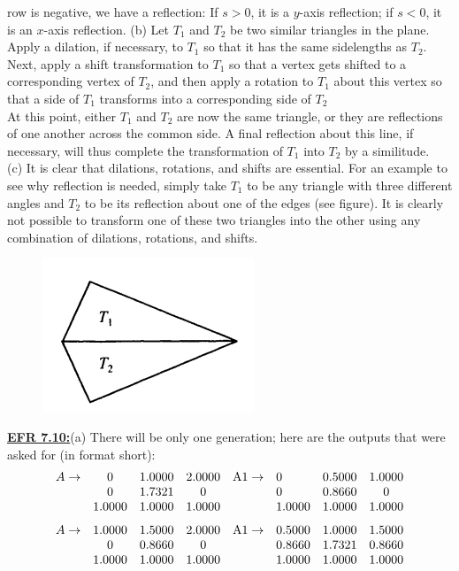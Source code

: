 \documentclass[../main.tex]{subfiles}
\begin{document}
row is negative, we have a reflection: If $s>0$, it is a $y$-axis reflection; if $s<0$, it is an $x$-axis reflection.
(b) Let $T_{1}$ and $T_{2}$ be two similar triangles in the plane. Apply a dilation, if necessary, to $T_{1}$ so that it has the same sidelengths as $T_{2}$. Next, apply a shift transformation to $T_{1}$ so that a vertex gets shifted to a corresponding vertex of $T_{2}$, and then apply a rotation to $T_{1}$ about this vertex so that a side of $T_{1}$ 
transforms into a corresponding side of $T_{2}$ \\
At this point, either $T_{1}$ and $T_{2}$ are now the same triangle, 
or they are reflections of one another across the common 
side. A final reflection about this line, if necessary, will 
thus complete the transformation of $T_{1}$ into $T_{2}$ by a similitude. \\
(c) It is clear that dilations, rotations, and shifts are 
essential. For an example to see why reflection is needed, 
simply take $T_{1}$ to be any triangle with three different 
angles and $T_{2}$ to be its reflection about one of the edges (see figure). It is clearly not possible to 
transform one of these two triangles into the other using any combination of dilations, rotations, and 
shifts. 
\begin{figure}[H]
    \centering
    \includegraphics[width=0.3\linewidth]{45}
    \label{pfig:ch13_45}
\end{figure}
\textbf{\underline{EFR 7.10:}}(a) There will be only one generation; here are the outputs that were asked for (in 
format short): 
$$
\begin{array}{cccc}
A \rightarrow & 0 & 1.0000 & 2.0000 \\
& 0 & 1.7321 & 0 \\
& 1.0000 & 1.0000 & 1.0000
\end{array}\\
\begin{array}{llcc}
\mathrm{A} 1 \rightarrow & 0 & 0.5000 & 1.0000 \\
& 0 & 0.8660 & 0 \\
& 1.0000 & 1.0000 & 1.0000
\end{array}
$$
$$
\begin{array}{cccc}
A \rightarrow & 1.0000 & 1.5000 & 2.0000 \\
& 0 & 0.8660 & 0 \\
& 1.0000 & 1.0000 & 1.0000
\end{array}\\
\begin{array}{llcc}
\mathrm{A} 1 \rightarrow & 0.5000 & 1.0000 & 1.5000 \\
& 0.8660 & 1.7321 & 0.8660 \\
& 1.0000 & 1.0000 & 1.0000
\end{array}
$$
\end{document}
